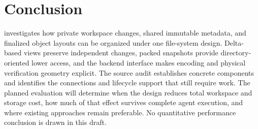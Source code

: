\section{Conclusion}

\sys investigates how private workspace changes, shared immutable metadata,
and finalized object layouts can be organized under one file-system design.
Delta-based views preserve independent changes, packed snapshots provide
directory-oriented lower access, and the backend interface makes encoding
and physical verification geometry explicit. The source audit establishes
concrete components and identifies the connections and lifecycle support
that still require work. The planned evaluation will determine when the
design reduces total workspace and storage cost, how much of that effect
survives complete agent execution, and where existing approaches remain
preferable. No quantitative performance conclusion is drawn in this draft.
